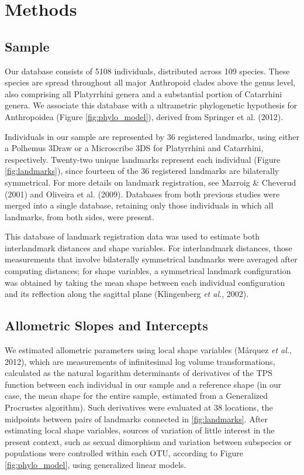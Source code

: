 \documentclass[12pt,]{article}
\begin{document}
\section{Methods}\label{methods}

\subsection{Sample}\label{sample}

Our database consists of 5108 individuals, distributed across 109
species. These species are spread throughout all major Anthropoid clades
above the genus level, also comprising all Platyrrhini genera and a
substantial portion of Catarrhini genera. We associate this database
with a ultrametric phylogenetic hypothesis for Anthropoidea (Figure
\ref{fig:phylo_model}), derived from Springer et al. (2012).

Individuals in our sample are represented by 36 registered landmarks,
using either a Polhemus 3Draw or a Microscribe 3DS for Platyrrhini and
Catarrhini, respectively. Twenty-two unique landmarks represent each
individual (Figure \ref{fig:landmarks}), since fourteen of the 36
registered landmarks are bilaterally symmetrical. For more details on
landmark registration, see Marroig \& Cheverud (2001) and Oliveira et
al. (2009). Databases from both previous studies were merged into a
single database, retaining only those individuals in which all
landmarks, from both sides, were present.

This database of landmark registration data was used to estimate both
interlandmark distances and shape variables. For interlandmark
distances, those measurements that involve bilaterally symmetrical
landmarks were averaged after computing distances; for shape variables,
a symmetrical landmark configuration was obtained by taking the mean
shape between each individual configuration and its reflection along the
sagittal plane (Klingenberg \emph{et al.}, 2002).

\subsection{Allometric Slopes and
Intercepts}\label{allometric-slopes-and-intercepts}

We estimated allometric parameters using local shape variables (Márquez
\emph{et al.}, 2012), which are measurements of infinitesimal log volume
transformations, calculated as the natural logarithm determinants of
derivatives of the TPS function between each individual in our sample
and a reference shape (in our case, the mean shape for the entire
sample, estimated from a Generalized Procrustes algorithm). Such
derivatives were evaluated at 38 locations, the midpoints between pairs
of landmarks connected in \autoref{fig:landmarks}. After estimating
local shape variables, sources of variation of little interest in the
present context, such as sexual dimorphism and variation between
subspecies or populations were controlled within each OTU, according to
Figure \ref{fig:phylo_model}, using generalized linear models.
\end{document}
